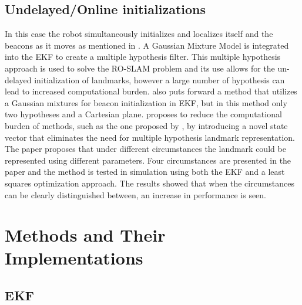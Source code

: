 \documentclass[conference]{IEEEtran}
\begin{document}
	\subsection{Undelayed/Online initializations}
		In this case the robot simultaneously initializes and localizes itself and the beacons as it moves
		as mentioned in \cite{Caballero2010}. A Gaussian Mixture Model is integrated into the EKF to create a multiple hypothesis filter.  This multiple hypothesis approach is used to solve the RO-SLAM problem and its use allows for the un-delayed initialization of landmarks, however a large number of hypothesis can lead to increased computational burden. \cite{Geneve2015} also puts forward a method that utilizes a Gaussian mixtures for beacon initialization in EKF, but in this method only two hypotheses and a Cartesian plane. \cite{Ahmad2011a} proposes to reduce the computational burden of methods, such as the one proposed by \cite{Caballero2010}, by introducing a novel state vector that eliminates the need for multiple hypothesis landmark representation. The paper proposes that under different circumstances the landmark could be represented using different parameters. Four circumstances are presented in the paper and the method is tested in simulation using both the EKF and a least squares optimization approach. The results showed that when the circumstances can be clearly distinguished between, an increase in performance is seen.



	
	

	\section{Methods and Their Implementations}
	\label{methods and their implementations}
	
	\subsection{EKF}
	
	
	
\end{document}
